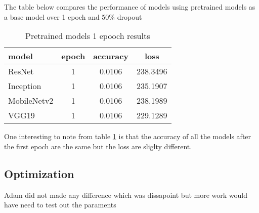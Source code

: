 The table below compares the performance of models using pretrained models as a base model over 1 epoch and 50\% dropout 

\begin{table}[h!]
\begin{center}
\begin{tabular}{ |l|c|c|c| } 
 \hline
 model & epoch & accuracy & loss \\ 
  \hline
 ResNet & 1 & 0.0106  & 238.3496   \\ 
 Inception & 1 & 0.0106 & 235.1907 \\ 
 MobileNetv2 & 1 & 0.0106  &  238.1989  \\
 VGG19 & 1 & 0.0106 &  229.1289  \\
 \hline
\end{tabular}
\caption{Pretrained models 1 epooch results}
\label{pretrained}
\end{center}
\end{table}

One interesting to note from table \ref{pretrained} is that the accuracy of all the models after the first epoch are the same but the loss are sliglty different.


\subsection{Optimization}
Adam did not made any difference which was dissapoint but more work would have need to test out the paraments
 


